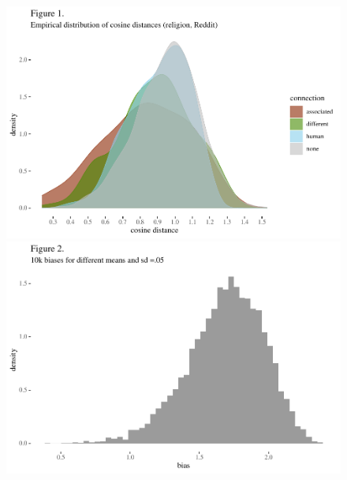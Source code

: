 \documentclass[12pt,dvipsnames,enabledeprecatedfontcommands]{scrartcl}
\begin{document}
\begin{center}
\begin{figure}[!htb]\centering
   \begin{minipage}{0.48\textwidth}

\begin{center}\includegraphics[width=1\linewidth]{abstractESSLLI1_files/figure-latex/unnamed-chunk-1-1} \end{center}
   \end{minipage}
   \begin {minipage}{0.48\textwidth}

\begin{center}\includegraphics[width=1\linewidth]{abstractESSLLI1_files/figure-latex/unnamed-chunk-2-1} \end{center}
   \end{minipage}
   

\end{figure}
\end{center}
\end{document}
